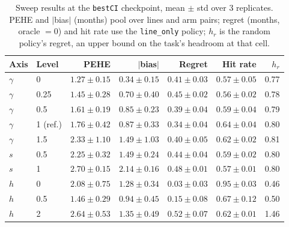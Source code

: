 \begin{table}[ht]
\centering\small
\caption{Sweep results at the \texttt{bestCI} checkpoint, mean $\pm$ std over 3 replicates.
PEHE and $|$bias$|$ (months) pool over lines and arm pairs; regret (months, oracle $=0$) and
hit rate use the \texttt{line\_only} policy; $h_r$ is the random policy's regret, an upper
bound on the task's headroom at that cell.}
\label{tab:semisynthetic:sweep-results}
\begin{tabular}{@{}llrrrrr@{}}
\toprule
Axis & Level & PEHE & $|$bias$|$ & Regret & Hit rate & $h_r$ \\
\midrule
$\gamma$ & 0        & $1.27\pm0.15$ & $0.34\pm0.15$ & $0.41\pm0.03$ & $0.57\pm0.05$ & 0.77 \\
$\gamma$ & 0.25      & $1.45\pm0.28$ & $0.70\pm0.40$ & $0.45\pm0.02$ & $0.56\pm0.02$ & 0.78 \\
$\gamma$ & 0.5       & $1.61\pm0.19$ & $0.85\pm0.23$ & $0.39\pm0.04$ & $0.59\pm0.04$ & 0.79 \\
$\gamma$ & 1 (ref.)  & $1.76\pm0.42$ & $0.87\pm0.33$ & $0.34\pm0.04$ & $0.64\pm0.04$ & 0.80 \\
$\gamma$ & 1.5       & $2.33\pm1.10$ & $1.49\pm1.03$ & $0.40\pm0.05$ & $0.62\pm0.02$ & 0.81 \\
$s$ & 0.5            & $2.25\pm0.32$ & $1.49\pm0.24$ & $0.44\pm0.04$ & $0.59\pm0.02$ & 0.80 \\
$s$ & 1               & $2.70\pm0.15$ & $2.14\pm0.16$ & $0.48\pm0.01$ & $0.57\pm0.01$ & 0.80 \\
$h$ & 0               & $2.08\pm0.75$ & $1.28\pm0.34$ & $0.03\pm0.03$ & $0.95\pm0.03$ & 0.46 \\
$h$ & 0.5             & $1.46\pm0.29$ & $0.94\pm0.45$ & $0.15\pm0.08$ & $0.67\pm0.12$ & 0.50 \\
$h$ & 2               & $2.64\pm0.53$ & $1.35\pm0.49$ & $0.52\pm0.07$ & $0.62\pm0.01$ & 1.46 \\
\bottomrule
\end{tabular}
\end{table}

